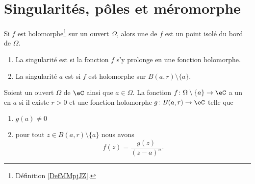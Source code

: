 
\section{Singularités, pôles et méromorphe}

\begin{definition}      \label{DEFooKWDUooVPvtpy}
    Si \( f\) est holomorphe\footnote{Définition \ref{DefMMpjJZ}.} sur un ouvert \( \Omega\), alors une  de \( f\) est un point isolé du bord de \( \Omega\).

    \begin{enumerate}
        \item
            La singularité est  si la fonction \( f\) s'y prolonge en une fonction holomorphe.
        \item
            La singularité \( a\) est  si \( f\) est holomorphe sur \( B(a,r)\setminus\{ a \}\).
    \end{enumerate}
\end{definition}


\begin{definition}    \label{DEFooUIJTooUJPiDG}
    Soient un ouvert \( \Omega\) de \( \eC\) ainsi que \( a\in \Omega\). La fonction \( f\colon \Omega\setminus\{ a \}\to \eC\) a un  en \( a\) si il existe \( r>0\) et une fonction holomorphe $g\colon B(a,r)\to \eC$ telle que
    \begin{enumerate}
        \item
            \( g(a)\neq 0\)
        \item
            pour tout \( z\in B(a,r)\setminus\{ a \}\) nous avons
            \begin{equation}
                f(z)=\frac{ g(z) }{ (z-a)^n }.
            \end{equation}
    \end{enumerate}
\end{definition}

